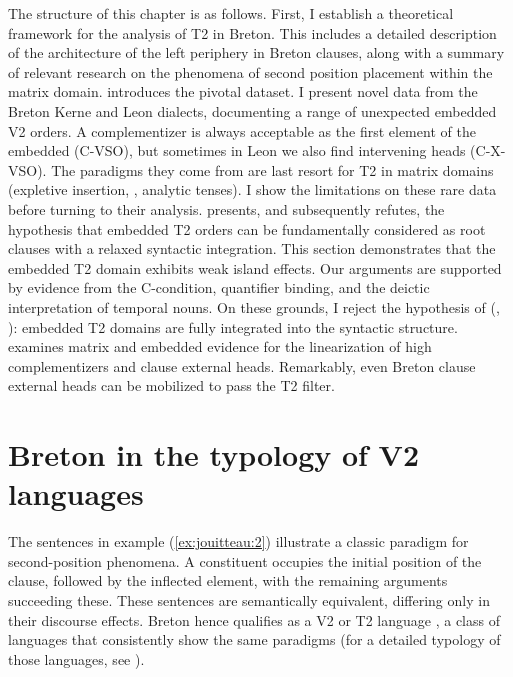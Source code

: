 \documentclass[output=paper,colorlinks,citecolor=brown]{langscibook}
\begin{document}
The structure of this chapter is as follows. First, I establish a theoretical framework for the analysis of T2 in Breton. This includes a detailed description of the architecture of the left periphery in Breton clauses, along with a summary of relevant research on the phenomena of second position placement within the matrix domain.  introduces the pivotal dataset. I present novel data from the Breton Kerne and Leon dialects, documenting a range of unexpected embedded V2 orders. A complementizer is always acceptable as the first element of the embedded (C-VSO), but sometimes in Leon we also find intervening heads (C-X-VSO). The paradigms they come from are last resort for T2 in matrix domains (expletive insertion, , analytic tenses). I show the limitations on these rare data before turning to their analysis.  presents, and subsequently refutes, the hypothesis that embedded T2 orders can be fundamentally considered as root clauses with a relaxed syntactic integration. This section demonstrates that the embedded T2 domain exhibits weak island effects. Our arguments are supported by evidence from the C-condition, quantifier binding, and the deictic interpretation of temporal nouns. On these grounds, I reject the hypothesis of \citeauthor{mj:Wurmbrand2012} (, ): embedded T2 domains are fully integrated into the syntactic structure.  examines matrix and embedded evidence for the linearization of high complementizers and clause external heads. Remarkably, even Breton clause external heads can be mobilized to pass the T2 filter. 

\section{Breton in the typology of V2 languages}\label{sec:jouitteau:2}

The sentences in example (\ref{ex:jouitteau:2}) illustrate a classic paradigm for second-position phenomena. A constituent occupies the initial position of the clause, followed by the inflected element, with the remaining arguments succeeding these. These sentences are semantically equivalent, differing only in their discourse effects. Breton hence qualifies as a V2 or T2 language \citep{mj:Stephens1982}, a class of languages that consistently show the same paradigms (for a detailed typology of those languages, see 
\citealt{mj:Jouitteau2010}). 
\end{document}
